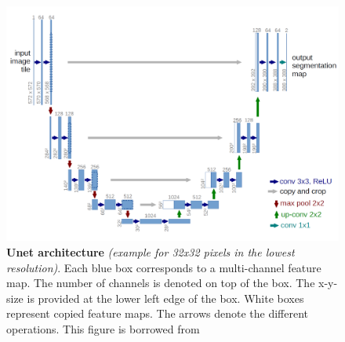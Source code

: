 \begin{figure}
\centerline{
\includegraphics[width=\textwidth]{figures/130_methods/unet_nocaption.pdf}
}
\caption{\textbf{Unet architecture} \textit{(example for 32x32 pixels in the lowest resolution)}.
    Each blue box corresponds to a multi-channel feature map. The number of channels is denoted on top of the box. The x-y-size is provided at the lower left edge of the box. White
    boxes represent copied feature maps. The arrows denote the different operations.
    This figure is borrowed from \protect {}
} \label{fig:unet_architecture}
\end{figure}